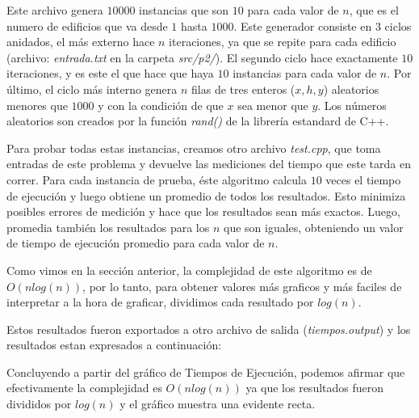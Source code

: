 Este archivo genera $10000$ instancias que son $10$ para cada valor de $n$, que es el numero de edificios que va desde $1$ hasta $1000$.
Este generador consiste en $3$ ciclos anidados, el más externo hace $n$ iteraciones, ya que se repite para cada edificio (archivo: \textit{entrada.txt} en la carpeta \textit{src/p2/}).
El segundo ciclo hace exactamente $10$ iteraciones, y es este el que hace que haya $10$ instancias para cada valor de $n$.
Por último, el ciclo más interno genera $n$ filas de tres enteros ($x, h, y$) aleatorios menores que $1000$ y con la condición de que $x$ sea menor que $y$.
Los números aleatorios son creados por la función \textit{rand()} de la librería estandard de C++.

Para probar todas estas instancias, creamos otro archivo \textit{test.cpp}, que toma entradas de este problema y devuelve las mediciones del tiempo que este tarda en correr.
Para cada instancia de prueba, éste algoritmo calcula $10$ veces el tiempo de ejecución y luego obtiene un promedio de todos los resultados. Esto minimiza posibles errores de medición y hace que los resultados sean más exactos.
Luego, promedia también los resultados para los $n$ que son iguales, obteniendo un valor de tiempo de ejecución promedio para cada valor de $n$.

Como vimos en la sección anterior, la complejidad de este algoritmo es de $O(nlog(n))$, por lo tanto, para obtener valores más graficos y más faciles de interpretar a la hora de graficar, dividimos cada resultado por $log(n)$.

Estos resultados fueron exportados a otro archivo de salida (\textit{tiempos.output}) y los resultados estan expresados a continuación:


Concluyendo a partir del gráfico de Tiempos de Ejecución, podemos afirmar que efectivamente la complejidad es $O(nlog(n))$ ya que los resultados fueron divididos por $log(n)$ y el gráfico muestra una evidente recta.
































